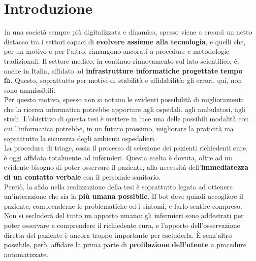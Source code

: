 \chapter{Introduzione}
\label{chap:introduzione}
In una società sempre più digitalizzata e dinamica, spesso viene a crearsi un netto distacco tra i settori capaci di \textbf{evolvere assieme alla tecnologia}, e quelli che, per un motivo o per l'altro, rimangono ancorati a procedure e metodologie tradizionali. Il settore medico, in continuo rinnovamento sul lato scientifico, è, anche in Italia, affidato ad \textbf{infrastrutture informatiche progettate tempo fa.} Questo, soprattutto per motivi di stabilità e affidabilità: gli errori, qui, non sono ammissibili. \\
Per questo motivo, spesso non si notano le evidenti possibilità di miglioramenti che la ricerca informatica potrebbe apportare agli ospedali, agli ambulatori, agli studi.
L'obiettivo di questa tesi è mettere in luce una delle possibili modalità con cui l'informatica potrebbe, in un futuro prossimo, migliorare la praticità ma soprattutto la sicurezza degli ambienti ospedalieri.\\
La procedura di triage, ossia il processo di selezione dei pazienti richiedenti cure, è oggi affidata totalmente ad infermieri. Questa scelta è dovuta, oltre ad un evidente bisogno di poter osservare il paziente, alla necessità dell'\textbf{immediatezza di un contatto verbale} con il personale sanitario. \\
Perciò, la sfida nella realizzazione della tesi è soprattutto legata ad ottenere un'interazione che sia la \textbf{più umana possibile}. Il bot deve quindi accogliere il paziente, comprenderne le problematiche ed i sintomi, e farlo sentire compreso. Non si escluderà del tutto un apporto umano: gli infermieri sono addestrati per poter osservare e comprendere il richiedente cura, e l'apporto dell'osservazione diretta del paziente è ancora troppo importante per escluderla. È senz'altro possibile, però, affidare la prima parte di \textbf{profilazione dell'utente} a procedure automatizzate.

